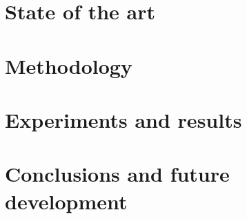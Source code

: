 \documentclass[a4paper,12pt,titlepage]{article}
\begin{document}
\section{State of the art}


\section{Methodology}


\section{Experiments and results}


\section{Conclusions and future development}


\printbibheading
\printbibliography
\end{document}
